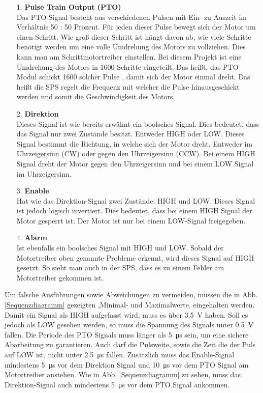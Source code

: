     \begin{itemize}
        \item [1.] \textbf{Pulse Train Output (PTO)} \\
        Das PTO-Signal besteht aus verschiedenen Pulsen mit Ein- zu Auszeit im Verhältnis 50 : 50 Prozent. Für jeden dieser Pulse bewegt sich der Motor um einen Schritt. Wie groß dieser Schritt ist hängt davon ab, wie viele Schritte benötigt werden um eine volle Umdrehung des Motors zu vollziehen. Dies kann man am Schrittmotortreiber einstellen. Bei diesem Projekt ist eine Umdrehung des Motors in 1600 Schritte eingeteilt. Das heißt, das PTO Modul schickt 1600 solcher Pulse , damit sich der Motor einmal dreht. Das heißt die SPS regelt die Frequenz mit welcher die Pulse hinausgeschickt werden und somit die Geschwindigkeit des Motors. 

        \item [2.] \textbf{Direktion} \\
        Dieses Signal ist wie bereits erwähnt ein boolsches Signal. Dies bedeutet, dass das Signal nur zwei Zustände besitzt. Entweder HIGH oder LOW. Dieses Signal bestimmt die Richtung, in welche sich der Motor dreht. Entweder im Uhrzeigersinn (CW) oder gegen den Uhrzeigersinn (CCW). Bei einem HIGH Signal dreht der Motor gegen den Uhrzeigersinn und bei einem LOW Signal im Uhrzeigersinn.

        \item [3.] \textbf{Enable} \\
        Hat wie das Direktion-Signal zwei Zustände: HIGH und LOW. Dieses Signal ist jedoch logisch invertiert. Dies bedeutet, dass bei einem HIGH Signal der Motor gesperrt ist. Der Motor ist nur bei einem LOW-Signal freigegeben. 

        \item [4.] \textbf{Alarm} \\
        Ist ebenfalls ein boolsches Signal mit HIGH und LOW. Sobald der Motortreiber oben genannte Probleme erkennt, wird dieses Signal auf HIGH gesetzt. So sieht man auch in der SPS, dass es zu einem Fehler am Motortreiber gekommen ist. 

    \end{itemize}

Um falsche Ausführungen sowie Abweichungen zu vermeiden, müssen die in Abb. \ref{Sequenzdiagramm} gezeigten ,Minimal- und Maximalwerte, eingehalten werden. Damit ein Signal als HIGH aufgefasst wird, muss es über \qty{3.5}{\volt} haben. Soll es jedoch als LOW gesehen werden, so muss die Spannung des Signals unter \qty{0.5}{\volt} fallen. Die Periode des PTO Signals muss länger als \qty{5}{\micro\second} sein, um eine sichere Abarbeitung zu garantieren. Auch darf die Pulsweite, sowie die Zeit die der Puls auf LOW ist, nicht unter \qty{2.5}{\micro\second} fallen. Zusätzlich muss das Enable-Signal mindestens \qty{5}{\micro\second} vor dem Direktion Signal und \qty{10}{\micro\second} vor dem PTO Signal am Motortreiber anstehen. Wie in Abb. \ref{Sequenzdiagramm} zu sehen, muss das Direktion-Signal auch mindestens \qty{5}{\micro\second} vor dem PTO Signal ankommen. 

